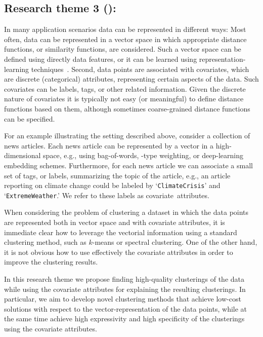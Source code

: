 \documentclass[a4paper,11pt]{article}
\begin{document}

\subsection*{Research theme 3 (\rth): \covariates}

In many application scenarios data can be represented in different ways: 
Most often, data can be represented in a vector space
in which appropriate distance functions, or similarity functions, are considered.
Such a vector space can be defined using directly data features, 
or it can be learned using representation-learning techniques~\cite{hamilton2017representation,wang2020survey}.
Second, data points are associated with covariates, 
which are discrete (categorical) attributes, 
representing certain aspects of the data. 
Such covariates can be labels, tags, or other related information.
Given the discrete nature of covariates it is typically not easy (or meaningful)
to define distance functions based on them, 
although sometimes coarse-grained distance functions can be specified.

For an example illustrating the setting described above, 
consider a collection of news articles. 
Each news article can be represented by a vector in a high-dimensional space, 
e.g., using bag-of-words, \tfidf-type weighting, or deep-learning embedding schemes. 
Furthermore, for each news article we can associate a small 
set of tags, or labels, summarizing the topic of the article, 
e.g., an article reporting on climate change could be labeled by
`\texttt{\small ClimateCrisis}' and `\texttt{\small ExtremeWeather}.'
We refer to these labels as covariate~attributes.

When considering the problem of clustering a dataset in which the data points are 
represented both in vector space and with covariate attributes, 
it is immediate clear how to leverage the vectorial information
using a standard clustering method, such as $k$-means or spectral clustering. 
One of the other hand, it is not obvious how to use effectively the 
covariate attributes in order to improve the clustering results. 

In this research theme we propose finding high-quality clusterings of the data
while using the covariate attributes for explaining the resulting clusterings. 
In particular, we aim to develop novel clustering methods
that achieve low-cost solutions with respect to the vector-representation of the data points, 
while at the same time achieve high expressivity and high specificity of the clusterings
using the covariate attributes. 
\end{document}
